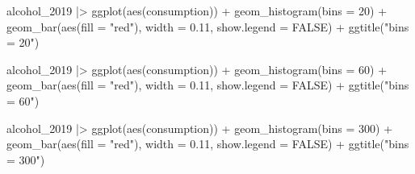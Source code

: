 \documentclass[
  letterpaper,
]{krantz}
\makeatletter
\newenvironment{Shaded}{\begin{snugshade}}{\end{snugshade}}
\newcommand{\AttributeTok}[1]{\textcolor[rgb]{0.40,0.45,0.13}{#1}}
\newcommand{\ConstantTok}[1]{\textcolor[rgb]{0.56,0.35,0.01}{#1}}
\newcommand{\DecValTok}[1]{\textcolor[rgb]{0.68,0.00,0.00}{#1}}
\newcommand{\FloatTok}[1]{\textcolor[rgb]{0.68,0.00,0.00}{#1}}
\newcommand{\FunctionTok}[1]{\textcolor[rgb]{0.28,0.35,0.67}{#1}}
\newcommand{\NormalTok}[1]{\textcolor[rgb]{0.00,0.23,0.31}{#1}}
\newcommand{\SpecialCharTok}[1]{\textcolor[rgb]{0.37,0.37,0.37}{#1}}
\newcommand{\StringTok}[1]{\textcolor[rgb]{0.13,0.47,0.30}{#1}}
\newenvironment{kframe}{%
\medskip{}
\setlength{\fboxsep}{.8em}
 \def\at@end@of@kframe{}%
 \ifinner\ifhmode%
  \def\at@end@of@kframe{\end{minipage}}%
  \begin{minipage}{\columnwidth}%
 \fi\fi%
 \def\FrameCommand##1{\hskip\@totalleftmargin \hskip-\fboxsep
 \colorbox{shadecolor}{##1}\hskip-\fboxsep
     \hskip-\linewidth \hskip-\@totalleftmargin \hskip\columnwidth}%
 \MakeFramed {\advance\hsize-\width
   \@totalleftmargin\z@ \linewidth\hsize
   \@setminipage}}%
 {\par\unskip\endMakeFramed%
 \at@end@of@kframe}
\renewenvironment{Shaded}{\begin{kframe}}{\end{kframe}}
\makeatother
\begin{document}
\begin{Shaded}
\begin{Highlighting}[]
\NormalTok{  alcohol\_2019 }\SpecialCharTok{|\textgreater{}}
  \FunctionTok{ggplot}\NormalTok{(}\FunctionTok{aes}\NormalTok{(consumption)) }\SpecialCharTok{+}
  \FunctionTok{geom\_histogram}\NormalTok{(}\AttributeTok{bins =} \DecValTok{20}\NormalTok{) }\SpecialCharTok{+}
  \FunctionTok{geom\_bar}\NormalTok{(}\FunctionTok{aes}\NormalTok{(}\AttributeTok{fill =} \StringTok{"red"}\NormalTok{), }\AttributeTok{width =} \FloatTok{0.11}\NormalTok{, }\AttributeTok{show.legend =} \ConstantTok{FALSE}\NormalTok{) }\SpecialCharTok{+}
  \FunctionTok{ggtitle}\NormalTok{(}\StringTok{"bins = 20"}\NormalTok{)}
\end{Highlighting}
\end{Shaded}

\begin{Shaded}
\begin{Highlighting}[]
\NormalTok{  alcohol\_2019 }\SpecialCharTok{|\textgreater{}}
  \FunctionTok{ggplot}\NormalTok{(}\FunctionTok{aes}\NormalTok{(consumption)) }\SpecialCharTok{+}
  \FunctionTok{geom\_histogram}\NormalTok{(}\AttributeTok{bins =} \DecValTok{60}\NormalTok{) }\SpecialCharTok{+}
  \FunctionTok{geom\_bar}\NormalTok{(}\FunctionTok{aes}\NormalTok{(}\AttributeTok{fill =} \StringTok{"red"}\NormalTok{), }\AttributeTok{width =} \FloatTok{0.11}\NormalTok{, }\AttributeTok{show.legend =} \ConstantTok{FALSE}\NormalTok{) }\SpecialCharTok{+}
  \FunctionTok{ggtitle}\NormalTok{(}\StringTok{"bins = 60"}\NormalTok{)}
\end{Highlighting}
\end{Shaded}

\begin{Shaded}
\begin{Highlighting}[]
\NormalTok{  alcohol\_2019 }\SpecialCharTok{|\textgreater{}}
  \FunctionTok{ggplot}\NormalTok{(}\FunctionTok{aes}\NormalTok{(consumption)) }\SpecialCharTok{+}
  \FunctionTok{geom\_histogram}\NormalTok{(}\AttributeTok{bins =} \DecValTok{300}\NormalTok{) }\SpecialCharTok{+}
  \FunctionTok{geom\_bar}\NormalTok{(}\FunctionTok{aes}\NormalTok{(}\AttributeTok{fill =} \StringTok{"red"}\NormalTok{), }\AttributeTok{width =} \FloatTok{0.11}\NormalTok{, }\AttributeTok{show.legend =} \ConstantTok{FALSE}\NormalTok{) }\SpecialCharTok{+}
  \FunctionTok{ggtitle}\NormalTok{(}\StringTok{"bins = 300"}\NormalTok{)}
\end{Highlighting}
\end{Shaded}
\end{document}
